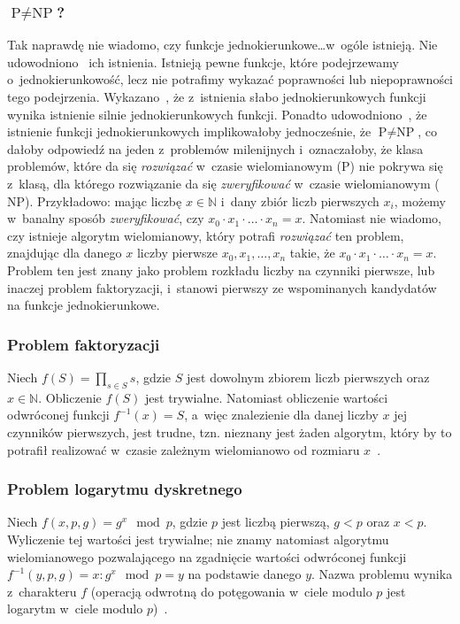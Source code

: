 \subsubsection{$\textrm{P} \neq \textrm{NP}$?}
Tak naprawdę nie wiadomo, czy funkcje jednokierunkowe\ldots w~ogóle istnieją.
Nie udowodniono~\cite{one_way_functions_existence} ich istnienia. Istnieją
pewne funkcje, które podejrzewamy o~jednokierunkowość, lecz nie potrafimy
wykazać poprawności lub niepoprawności tego podejrzenia.
Wykazano~\cite{one_way_functions}, że z~istnienia słabo jednokierunkowych
funkcji wynika istnienie silnie jednokierunkowych funkcji. Ponadto
udowodniono~\cite{one_way_functions}, że istnienie funkcji jednokierunkowych
implikowałoby jednocześnie, że $\textrm{P} \neq \textrm{NP}$, co dałoby
odpowiedź na jeden z~problemów milenijnych i~oznaczałoby, że klasa problemów,
które da się \emph{rozwiązać} w~czasie wielomianowym ($\textrm{P}$) nie pokrywa
się z~klasą, dla którego rozwiązanie da się \emph{zweryfikować} w~czasie
wielomianowym ($\textrm{NP}$). Przykładowo: mając liczbę $x \in \mathbb{N}$
i~dany zbiór liczb pierwszych $x_i$, możemy w~banalny sposób
\emph{zweryfikować}, czy $x_0 \cdot x_1 \cdot \ldots \cdot x_n = x$. Natomiast
nie wiadomo, czy istnieje algorytm wielomianowy, który potrafi \emph{rozwiązać}
ten problem, znajdując dla danego $x$ liczby pierwsze $x_0, x_1, \ldots, x_n$
takie, że $x_0 \cdot x_1 \cdot \ldots \cdot x_n = x$. Problem ten jest znany
jako problem rozkładu liczby na czynniki pierwsze, lub inaczej problem
faktoryzacji, i~stanowi pierwszy ze wspominanych kandydatów na funkcje
jednokierunkowe.



\subsubsection{Problem faktoryzacji}
Niech $f(S) = \prod_{s \in S} s$, gdzie $S$ jest dowolnym zbiorem liczb
pierwszych oraz $x \in \mathbb{N}$. Obliczenie $f(S)$ jest trywialne. Natomiast
obliczenie wartości odwróconej funkcji $f^{-1}(x)=S$, a~więc znalezienie dla
danej liczby $x$ jej czynników pierwszych, jest trudne, tzn. nieznany jest
żaden algorytm, który by to potrafił realizować w~czasie zależnym wielomianowo
od rozmiaru $x$~\cite{gregg2003factoring}.



\subsubsection{Problem logarytmu dyskretnego}
Niech $f(x, p, g) = g^x \mod p$, gdzie $p$ jest liczbą pierwszą, $g < p$ oraz
$x < p$. Wyliczenie tej wartości jest trywialne; nie znamy natomiast algorytmu
wielomianowego pozwalającego na zgadnięcie wartości odwróconej funkcji
\mbox{$f^{-1}(y, p, g) = x : g^x \mod p = y$} na podstawie danego $y$. Nazwa
problemu wynika z~charakteru $f$ (operacją odwrotną do potęgowania w~ciele
modulo $p$ jest logarytm w~ciele modulo $p$)~\cite{gregg2003factoring}.



